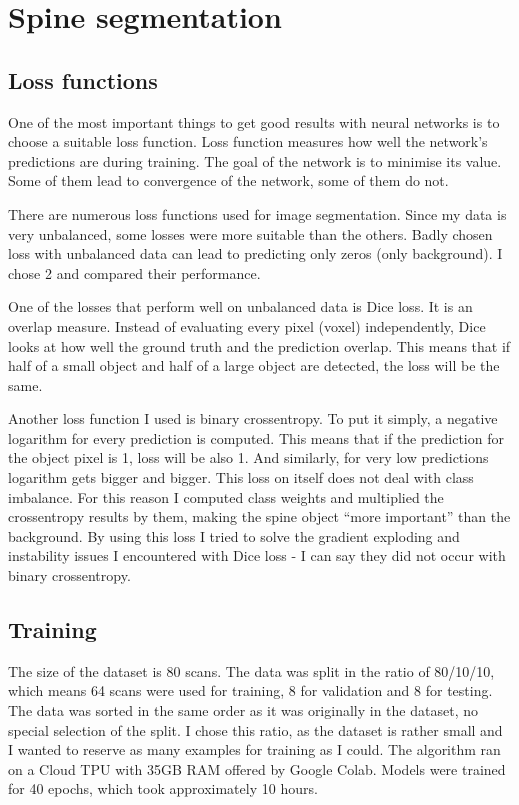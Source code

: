 \section{Spine segmentation}

\subsection{Loss functions}
One of the most important things to get good results with neural networks is to choose a suitable loss function. Loss function measures how well the network's predictions are during training. The goal of the network is to minimise its value. Some of them lead to convergence of the network, some of them do not.

There are numerous loss functions used for image segmentation. Since my data is very unbalanced, some losses were more suitable than the others. Badly chosen loss with unbalanced data can lead to predicting only zeros (only background). I chose 2 and compared their performance.

One of the losses that perform well on unbalanced data is Dice loss. It is an overlap measure. Instead of evaluating every pixel (voxel) independently, Dice looks at how well the ground truth and the prediction overlap. This means that if half of a small object and half of a large object are detected, the loss will be the same.

Another loss function I used is binary crossentropy. To put it simply, a negative logarithm for every prediction is computed. This means that if the prediction for the object pixel is 1, loss will be also 1. And similarly, for very low predictions logarithm gets bigger and bigger. This loss on itself does not deal with class imbalance. For this reason I computed class weights and multiplied the crossentropy results by them, making the spine object ``more important'' than the background. By using this loss I tried to solve the gradient exploding and instability issues I encountered with Dice loss - I can say they did not occur with binary crossentropy.

\subsection{Training}
The size of the dataset is 80 scans. The data was split in the ratio of 80/10/10, which means 64 scans were used for training, 8 for validation and 8 for testing. The data was sorted in the same order as it was originally in the dataset, no special selection of the split. I chose this ratio, as the dataset is rather small and I wanted to reserve as many examples for training as I could. The algorithm ran on a Cloud TPU with 35GB RAM offered by Google Colab. Models were trained for 40 epochs, which took approximately 10 hours. 

